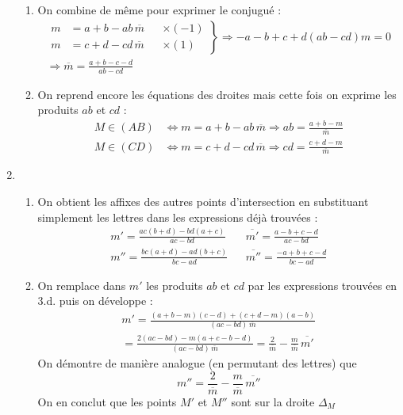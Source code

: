 \begin{enumerate}
\begin{enumerate}
 \item On combine de même pour exprimer le conjugué :
\begin{multline*}
 \left. 
\begin{aligned}
 m &= a + b - ab\,\overline{m} & &\times(-1)\\
 m &= c + d - cd\,\overline{m} & &\times(1)
\end{aligned}
\right\rbrace
\Rightarrow
 -a -b +c +d (ab-cd)m = 0 \\
\Rightarrow
 \overline{m} = \frac{a + b -c -d }{ab-cd}
\end{multline*}

 \item On reprend encore les équations des droites mais cette fois on exprime les produits $ab$ et $cd$ :
\begin{align*}
 M\in (AB) &\Leftrightarrow m =a +b-ab\,\overline{m} \Rightarrow ab = \frac{a+b-m}{\overline{m}}\\
 M\in (CD) &\Leftrightarrow m =c +d-cd\,\overline{m} \Rightarrow cd = \frac{c+d-m}{\overline{m}}
\end{align*}

\end{enumerate}
 
 \item
\begin{enumerate}
 \item On obtient les affixes des autres points d'intersection en substituant simplement les lettres dans les expressions déjà trouvées :
\begin{align*}
  m' = \frac{ac(b+d)-bd(a+c)}{ac-bd} & & \overline{m'} = \frac{a - b +c -d }{ac-bd} \\
  m'' = \frac{bc(a+d)-ad(b+c)}{bc-ad} & & \overline{m''} = \frac{-a + b +c -d }{bc-ad}
\end{align*}

 \item On remplace dans $m'$ les produits $ab$ et $cd$ par les expressions trouvées en 3.d. puis on développe :
\begin{multline*}
 m'=
\frac{(a+b-m)(c-d)+(c+d-m)(a-b)}{(ac-bd)\,\overline{m}}\\
 =
\frac{2(ac-bd)-m(a+c-b-d)}{(ac-bd)\,\overline{m}} 
 =
\frac{2}{\overline{m}} - \frac{m}{\overline{m}}\,\overline{m'}
\end{multline*}
On démontre de manière analogue (en permutant des lettres) que
\begin{displaymath}
 m'' = \frac{2}{\overline{m}} - \frac{m}{\overline{m}}\,\overline{m''}
\end{displaymath}
On en conclut que les points $M'$ et $M''$ sont sur la droite $\Delta_M$
\end{enumerate}
  
\end{enumerate}

